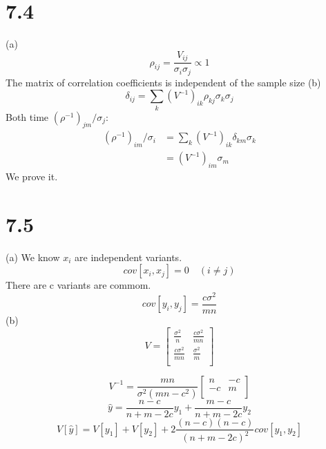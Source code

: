 \documentclass{article}
\begin{document}
\begin{CJK*}{GBK}{song}
\section{7.4}
(a)
\begin{equation}
\rho_{ij}=\frac{V_{ij}}{\sigma_i\sigma_j}\propto 1
\end{equation}
The matrix of correlation coefficients is independent of the sample size
(b)
\begin{equation}
\delta_{ij}=\sum_k(V^{-1})_{ik}\rho_{kj}\sigma_k\sigma_j
\end{equation}
Both time $(\rho^{-1})_{jm}/\sigma_j$:
\begin{equation}
\begin{aligned}
(\rho^{-1})_{im}/\sigma_i&=\sum_k(V^{-1})_{ik}\delta_{km}\sigma_k\\
&=(V^{-1})_{im}\sigma_m
\end{aligned}
\end{equation}
We prove it.

\section{7.5}
(a)
We know $x_i$ are independent variants.
\begin{equation}
cov[x_i,x_j]=0\quad(i\neq j)
\end{equation}
There are c variants are commom.
\begin{equation}
cov[y_i,y_j]=\frac{c\sigma^2}{mn}
\end{equation}
(b)
\begin{equation}
V=
\begin{bmatrix}
   \frac{\sigma^2}{n} & \frac{c\sigma^2}{mn}  \\
   \frac{c\sigma^2}{mn} & \frac{\sigma^2}{m}\\
  \end{bmatrix}
\end{equation}

\begin{equation}
V^{-1}=\frac{mn}{\sigma^2(mn-c^2)}
\begin{bmatrix}
   n  & -c  \\
   -c & m\\
  \end{bmatrix}
\end{equation}
\begin{equation}
\hat{y}=\frac{n-c}{n+m-2c}y_1+\frac{m-c}{n+m-2c}y_2
\end{equation}
\begin{equation}
V[\hat{y}]=V[y_1]+V[y_2]+2\frac{(n-c)(n-c)}{(n+m-2c)^2}cov[y_1,y_2]
\end{equation}


\end{CJK*}
\end{document}
